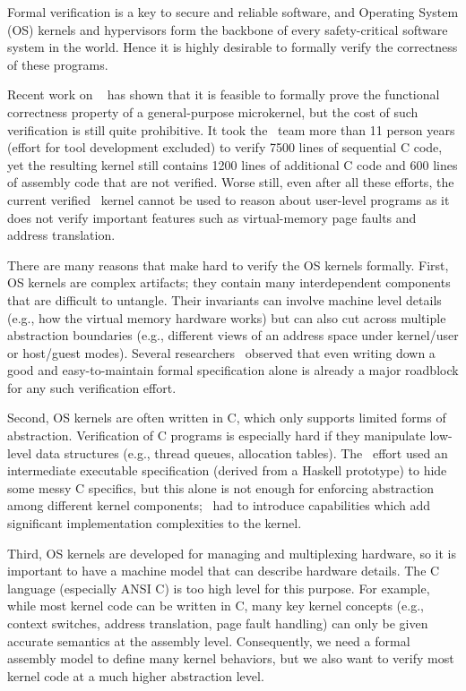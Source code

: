Formal verification is a key to secure and reliable software, and  Operating System (OS) kernels and hypervisors form the backbone of every safety-critical software system in the world. 
Hence it is highly desirable to formally verify the correctness of these programs.

Recent work on \selfour~\cite{klein2009sel4,klein14} has shown that it is feasible to formally prove the functional correctness property of a general-purpose microkernel, but the cost of such verification is still quite prohibitive. 
It took the \selfour\ team more than 11 person years (effort for tool development excluded) to verify 7500 lines of sequential C code, yet the resulting kernel still contains 1200 lines of additional C code and 600 lines of assembly code that are not verified. 
Worse still, even after all these efforts, the current verified \selfour\ kernel cannot be used to reason about user-level programs as it does not verify important features such as virtual-memory page faults and address translation.

There are many reasons that make hard to verify the OS kernels formally.
First, OS kernels are complex artifacts; they contain many interdependent components that are difficult to untangle.
Their invariants can involve machine level details (e.g., how the virtual memory hardware works) but can also cut across multiple abstraction boundaries (e.g., different views of an address space under kernel/user or host/guest modes).
Several researchers~\cite{baumann12,vaynberg12} observed that even writing down a good and easy-to-maintain formal specification alone is already a major roadblock for any such verification effort.

Second, OS kernels are often written in C, which only supports limited forms of abstraction.  Verification of C programs is especially hard if they manipulate low-level data structures (e.g., thread queues, allocation tables).  
The \selfour\ effort used an intermediate executable specification (derived from a Haskell prototype) to hide some messy C specifics, but this alone is not enough for enforcing abstraction among different kernel components; \selfour\ had to introduce capabilities which add significant implementation complexities to the kernel.

Third, OS kernels are developed for managing and multiplexing hardware, so it is important to have a machine model that can describe hardware details.
The C language (especially ANSI C) is too high level for this purpose. For example, while most kernel code can be written in C, many key kernel concepts (e.g., context switches, address translation, page fault handling) can only be given accurate semantics at the assembly level. Consequently, we need a formal assembly model to define many kernel behaviors, but we also want to verify most kernel code at a much higher abstraction level.

